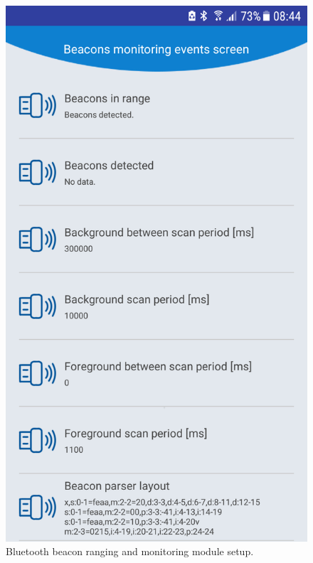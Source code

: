 \documentclass[../main.tex]{subfiles}
\begin{document}
\begin{figure}[!htbp]
\begin{minipage}{0.33\linewidth}
\includegraphics[width=\textwidth, clip]{pictures/app_beacon_settings.png}
\caption{Bluetooth beacon ranging and monitoring module setup.}
\label{fig:app_beacon_settings}
\end{minipage}\hfill%
\begin{minipage}{0.33\linewidth}

\end{minipage}
\end{figure}
\end{document}
